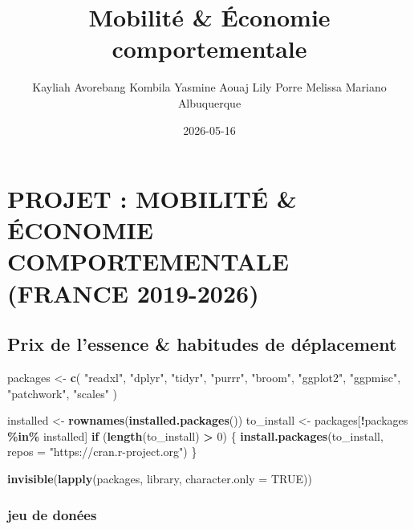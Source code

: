 \documentclass[
]{article}
\title{Mobilité \& Économie comportementale}
\author{Kayliah Avorebang Kombila \textbar{} Yasmine Aouaj \textbar{}
Lily Porre \textbar{} Melissa Mariano Albuquerque}
\date{2026-05-16}
\newenvironment{Shaded}{\begin{snugshade}}{\end{snugshade}}
\newcommand{\AttributeTok}[1]{\textcolor[rgb]{0.13,0.29,0.53}{#1}}
\newcommand{\ConstantTok}[1]{\textcolor[rgb]{0.56,0.35,0.01}{#1}}
\newcommand{\ControlFlowTok}[1]{\textcolor[rgb]{0.13,0.29,0.53}{\textbf{#1}}}
\newcommand{\DecValTok}[1]{\textcolor[rgb]{0.00,0.00,0.81}{#1}}
\newcommand{\FunctionTok}[1]{\textcolor[rgb]{0.13,0.29,0.53}{\textbf{#1}}}
\newcommand{\NormalTok}[1]{#1}
\newcommand{\OtherTok}[1]{\textcolor[rgb]{0.56,0.35,0.01}{#1}}
\newcommand{\SpecialCharTok}[1]{\textcolor[rgb]{0.81,0.36,0.00}{\textbf{#1}}}
\newcommand{\StringTok}[1]{\textcolor[rgb]{0.31,0.60,0.02}{#1}}
\begin{document}
\maketitle

\section{PROJET : MOBILITÉ \& ÉCONOMIE COMPORTEMENTALE (FRANCE
2019-2026)}\label{projet-mobilituxe9-uxe9conomie-comportementale-france-2019-2026}

\subsection{Prix de l'essence \& habitudes de
déplacement}\label{prix-de-lessence-habitudes-de-duxe9placement}

\begin{Shaded}
\begin{Highlighting}[]
\NormalTok{packages }\OtherTok{\textless{}{-}} \FunctionTok{c}\NormalTok{(}
  \StringTok{"readxl"}\NormalTok{,}
  \StringTok{"dplyr"}\NormalTok{,}
  \StringTok{"tidyr"}\NormalTok{,}
  \StringTok{"purrr"}\NormalTok{,}
  \StringTok{"broom"}\NormalTok{,}
  \StringTok{"ggplot2"}\NormalTok{,}
  \StringTok{"ggpmisc"}\NormalTok{,}
  \StringTok{"patchwork"}\NormalTok{,}
  \StringTok{"scales"}
\NormalTok{)}

\NormalTok{installed  }\OtherTok{\textless{}{-}} \FunctionTok{rownames}\NormalTok{(}\FunctionTok{installed.packages}\NormalTok{())}
\NormalTok{to\_install }\OtherTok{\textless{}{-}}\NormalTok{ packages[}\SpecialCharTok{!}\NormalTok{packages }\SpecialCharTok{\%in\%}\NormalTok{ installed]}
\ControlFlowTok{if}\NormalTok{ (}\FunctionTok{length}\NormalTok{(to\_install) }\SpecialCharTok{\textgreater{}} \DecValTok{0}\NormalTok{) \{}
  \FunctionTok{install.packages}\NormalTok{(to\_install, }\AttributeTok{repos =} \StringTok{"https://cran.r{-}project.org"}\NormalTok{)}
\NormalTok{\}}

\FunctionTok{invisible}\NormalTok{(}\FunctionTok{lapply}\NormalTok{(packages, library, }\AttributeTok{character.only =} \ConstantTok{TRUE}\NormalTok{))}
\end{Highlighting}
\end{Shaded}

\subsubsection{jeu de donées}\label{jeu-de-donuxe9es}
\end{document}
